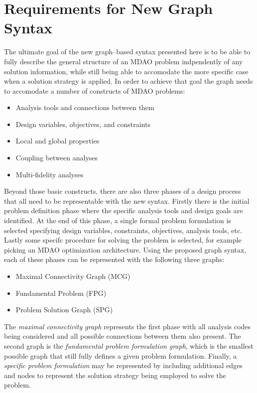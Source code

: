 \newcommand{\st}{ \ | \ }

\section{Requirements for New Graph Syntax}
The ultimate goal of the new graph--based syntax presented here is to be able to 
fully describe the general structure of an MDAO problem indpendently of any solution information, 
while still being able to accomodate the more specific case when a solution 
strategy is applied. In order to achieve that goal 
the graph needs to accomodate a number of constructs of MDAO problems: 
\begin{itemize}
    \item Analysis tools and connections between them
    \item Design variables, objectives, and constraints
    \item Local and global properties
    \item Coupling between analyses
    \item Multi-fidelity analyses
\end{itemize}

Beyond those basic constructs, there are also three phases of a design process that 
all need to be representable with the new syntax. Firstly there is the initial problem definition
phase where the specific analysis tools and design goals are identified. At the end of this phase, 
a single formal problem formulation is selected specifying design variables, constraints, objectives, 
analysis tools, etc. Lastly some specifc procedure for solving the problem is selected, for example 
picking an MDAO optimization architecture. Using the proposed graph syntax, each of these phases 
can be represented with the following three graphs:
\begin{itemize}
    \item Maximal Connectivity Graph (MCG)
    \item Fundamental Problem  (FPG)
    \item Problem Solution Graph (SPG)
\end{itemize}

The \emph{maximal connectivity graph} represents the first phase with all 
analysis codes being considered and all possible connections between them also present. The second graph 
is the \emph{fundamental problem formulation graph}, which is the smallest possible graph 
that still fully defines a given problem formulation. Finally, a \emph{specific problem formulation} 
may be represented by including additional edges and nodes to represent the 
solution strategy being employed to solve the problem. 

